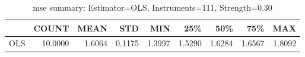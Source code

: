 \begin{table}[ht]
\centering
\caption{mse summary: Estimator=OLS, Instruments=111, Strength=0.30}
\begin{tabular}{lrrrrrrrr}
\toprule
 & COUNT & MEAN & STD & MIN & 25\% & 50\% & 75\% & MAX \\
\midrule
OLS & 10.0000 & 1.6064 & 0.1175 & 1.3997 & 1.5290 & 1.6284 & 1.6567 & 1.8092 \\
\bottomrule
\end{tabular}
\end{table}
